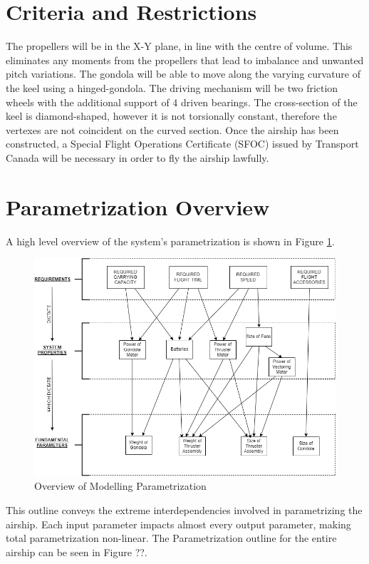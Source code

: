 \documentclass[../main.tex]{subfiles}
\begin{document}
\section{Criteria and Restrictions}
The propellers will be in the X-Y plane, in line with the centre of volume. This eliminates any moments from the propellers that lead to imbalance and unwanted pitch variations. The gondola will be able to move along the varying curvature of the keel using a hinged-gondola. The driving mechanism will be two friction wheels with the additional support of 4 driven bearings. The cross-section of the keel is diamond-shaped, however it is not torsionally constant, therefore the vertexes are not coincident on the curved section. Once the airship has been constructed, a Special Flight Operations Certificate (SFOC) issued by Transport Canada will be necessary in order to fly the airship lawfully.

\section{Parametrization Overview}
A high level overview of the system's parametrization is shown in Figure \ref{fig:ModellingOutline}.

\begin{figure}[H]
	\centering
	\includegraphics[width=\textwidth]{img/paramaterization/Brief_Overview.png}
	\caption{Overview of Modelling Parametrization}
	\label{fig:ModellingOutline}
\end{figure}

This outline conveys the extreme interdependencies involved in parametrizing the airship. Each input parameter impacts almost every output parameter, making total parametrization non-linear. The Parametrization outline for the entire airship can be seen in Figure ??.
\end{document}
